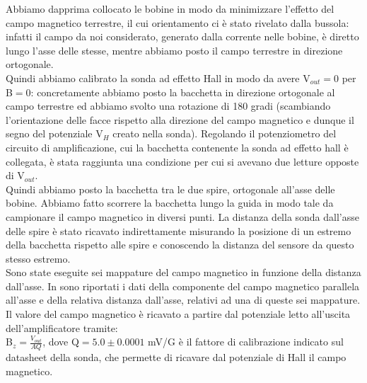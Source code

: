 Abbiamo dapprima collocato le bobine in modo da minimizzare l'effetto del campo magnetico terrestre, il cui orientamento ci è stato rivelato dalla bussola: infatti il campo da noi considerato, generato dalla corrente nelle bobine, è diretto lungo l'asse delle stesse, mentre abbiamo posto il campo terrestre in direzione ortogonale.\\
 Quindi abbiamo calibrato la sonda ad effetto Hall in modo da avere V$_{out}=0$ per B$=0$: concretamente abbiamo posto la bacchetta in direzione ortogonale al campo terrestre ed abbiamo svolto una rotazione di 180 gradi (scambiando l'orientazione delle facce rispetto alla direzione del campo magnetico e dunque il segno del potenziale V$_H$ creato nella sonda). Regolando il potenziometro del circuito di amplificazione, cui la bacchetta contenente la sonda ad effetto hall è collegata, è stata raggiunta una condizione per cui si avevano due letture opposte di V$_{out}$.\\
 Quindi abbiamo posto la bacchetta tra le due spire, ortogonale all'asse delle bobine. Abbiamo fatto scorrere la bacchetta lungo la guida in modo tale da campionare il campo magnetico in diversi punti. La distanza della sonda dall'asse delle spire è stato ricavato indirettamente misurando la posizione di un estremo della bacchetta rispetto alle spire e conoscendo la distanza del sensore da questo stesso estremo.\\
 Sono state eseguite sei mappature del campo magnetico in funzione della distanza dall'asse.
 In  sono riportati i dati della componente del campo magnetico parallela all'asse e della relativa distanza dall'asse, relativi ad una di queste sei mappature. Il valore del campo magnetico è ricavato a partire dal potenziale letto all'uscita dell'amplificatore tramite:\\ B$_z = \frac{V_{out}}{AQ}$,   dove Q$=5.0 \pm 0.0001$ mV/G è il fattore di calibrazione indicato sul datasheet della sonda, che permette di ricavare dal potenziale di Hall il campo magnetico.
